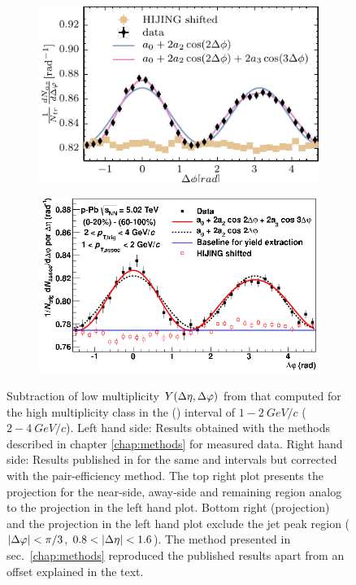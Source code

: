 \begin{figure}
\begin{subfigure}[b]{0.5\textwidth}
  \end{subfigure}
  \begin{subfigure}[b]{0.5\textwidth}
    \includegraphics[width=\textwidth]{figures/subtraction_px_12_24_nothresh.pdf}
  \end{subfigure}%
  \begin{subfigure}[b]{0.5\textwidth}
    \includegraphics[width=\textwidth]{figures/figures_ALICE_paper/projection_to_phi_without_peak.png}
  \end{subfigure}
  \caption[Subtraction of low multiplicity $Y(\deta, \dphi )$ from that computed for the high multiplicity class in the \ptassoc (\pttrig) interval of $1-\SI{2}{GeV/c}$ ($2-\SI{4}{GeV/c}$) and no threshold.]{Subtraction of low multiplicity $Y(\deta, \dphi )$ from that computed for the high multiplicity class in the \ptassoc (\pttrig) interval of $1-\SI{2}{GeV/c}$ ($2-\SI{4}{GeV/c}$). Left hand side: Results obtained with the methods described in chapter \ref{chap:methods} for measured data. Right hand side: Results published in \cite{Abelev2012} for the same \ptassoc and \pttrig intervals but corrected with the pair-efficiency method. The top right plot presents the \deta projection for the \gls{near-side}, \gls{away-side} and remaining region analog to the \deta projection in the left hand plot. Bottom right (\dphi projection) and the \dphi projection in the left hand plot exclude the jet peak region ($|\Delta\varphi| < \pi /3$, $0.8 < |\Delta\eta| < 1.6$). The method presented in sec.~\ref{chap:methods}  reproduced the published results apart from an offset explained in the text.}
  \label{fig:comparison_to_pub}
\end{figure}

